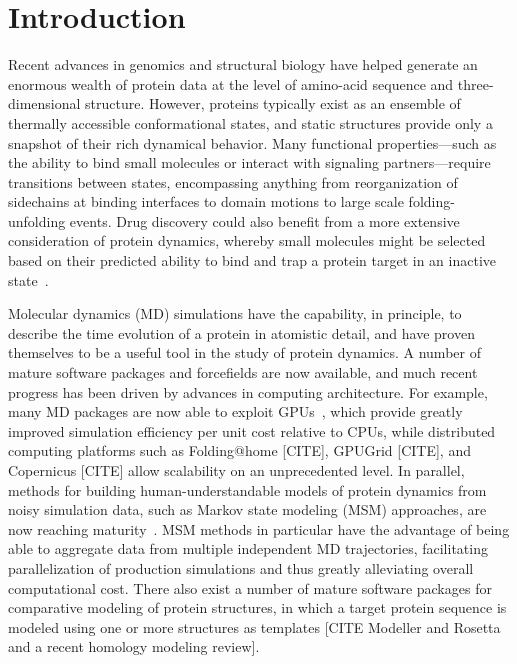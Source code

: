 \documentclass[aps,pre,twocolumn,nofootinbib,superscriptaddress,linenumbers]{revtex4-1}
\begin{document}
\maketitle

\section{Introduction}
\label{section:introduction}

Recent advances in genomics and structural biology have helped generate an enormous wealth of protein data at the level of amino-acid sequence and three-dimensional structure.
However, proteins typically exist as an ensemble of thermally accessible conformational states, and static structures provide only a snapshot of their rich dynamical behavior.
Many functional properties---such as the ability to bind small molecules or interact with signaling partners---require transitions between states, encompassing anything from reorganization of sidechains at binding interfaces to domain motions to large scale folding-unfolding events.
Drug discovery could also benefit from a more extensive consideration of protein dynamics, whereby small molecules might be selected based on their predicted ability to bind and trap a protein target in an inactive state~\cite{craik:science:2009:trapping-moving-targets}.

Molecular dynamics (MD) simulations have the capability, in principle, to describe the time evolution of a protein in atomistic detail, and have proven themselves to be a useful tool in the study of protein dynamics.
A number of mature software packages and forcefields are now available, and much recent progress has been driven by advances in computing architecture.
For example, many MD packages are now able to exploit GPUs~\cite{eastman:jctc:2012:openmm,walker:jctc:2013:amber-gpu}, which provide greatly improved simulation efficiency per unit cost relative to CPUs, while distributed computing platforms such as Folding@home [CITE], GPUGrid [CITE], and Copernicus [CITE] allow scalability on an unprecedented level.
In parallel, methods for building human-understandable models of protein dynamics from noisy simulation data, such as Markov state modeling (MSM) approaches, are now reaching maturity~\cite{pande-beauchamp-bowman:2010:methods:markov-model-review,noe:jcp:2010:msm-review,chodera-noe:curr-opin-struct-biol:2014:msm-review}.
MSM methods in particular have the advantage of being able to aggregate data from multiple independent MD trajectories, facilitating parallelization of production simulations and thus greatly alleviating overall computational cost.
There also exist a number of mature software packages for comparative modeling of protein structures, in which a target protein sequence is modeled using one or more structures as templates [CITE Modeller and Rosetta and a recent homology modeling review].
\end{document}
